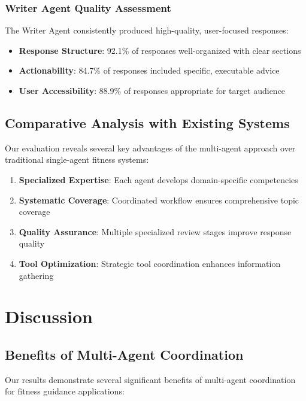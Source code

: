 \documentclass[conference]{IEEEtran}
\begin{document}
\subsubsection{Writer Agent Quality Assessment}

The Writer Agent consistently produced high-quality, user-focused responses:

\begin{itemize}
\item \textbf{Response Structure}: 92.1\% of responses well-organized with clear sections
\item \textbf{Actionability}: 84.7\% of responses included specific, executable advice
\item \textbf{User Accessibility}: 88.9\% of responses appropriate for target audience
\end{itemize}

\subsection{Comparative Analysis with Existing Systems}

Our evaluation reveals several key advantages of the multi-agent approach over traditional single-agent fitness systems:

\begin{enumerate}
\item \textbf{Specialized Expertise}: Each agent develops domain-specific competencies
\item \textbf{Systematic Coverage}: Coordinated workflow ensures comprehensive topic coverage
\item \textbf{Quality Assurance}: Multiple specialized review stages improve response quality
\item \textbf{Tool Optimization}: Strategic tool coordination enhances information gathering
\end{enumerate}

\section{Discussion}

\subsection{Benefits of Multi-Agent Coordination}

Our results demonstrate several significant benefits of multi-agent coordination for fitness guidance applications:
\end{document}
